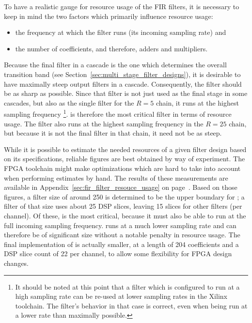 To  have a  realistic gauge  for  resource usage  of  the FIR  filters, it  is
necessary to keep  in mind the two factors which  primarily influence resource
usage:
\begin{itemize}\tightlist
    \item
        the frequency  at which the  filter runs (its incoming  sampling rate)
        and
    \item
         the number of coefficients, and therefore, adders and multipliers.
\end{itemize}
Because the final filter in a cascade  is the one which determines the overall
transition  band  (see  Section~\ref{sec:multi_stage_filter_designs}),  it  is
desirable to have  maximally steep output filters  in a cascade. Consequently,
the filter  should be as  sharp as possible. Since that filter is
not just  used as the  final stage  in some cascades,  but also as  the single
filter for the $R=5$ chain, it runs at the highest sampling frequency%
\footnote{%
    It should be noted at this point  that a filter which is configured to run
    at a  high sampling  rate can be  re-used at lower  sampling rates  in the
    Xilinx toolchain. The filter's behavior in that case is correct, even when
    being run at a lower rate than maximally possible.%
}.
  is therefore  the most  critical  filter in  terms of  resource
usage. The filter  also runs  at the highest sampling frequency in
the $R=25$  chain, but because it  is not the  final filter in that  chain, it
need not be as steep.

While it is possible to estimate the needed resources of a given filter design
based on  its specifications,  reliable figures  are best  obtained by  way of
experiment. The FPGA toolchain might make optimizations which are hard to take
into  account  when  performing  estimates  by hand.   The  results  of  these
measurements are  available in  Appendix~\ref{sec:fir_filter_resouce_usage} on
page~\pageref{sec:fir_filter_resouce_usage}. Based on those  figures, a filter
size  of  around  \num{250}  is  determined  to  be  the  upper  boundary  for
; a filter  of that size uses about \num{25}  DSP slices, leaving
\num{15} slices  for other filters  (per channel).  Of these,   is
the most critical,  because it must also  be able to run at  the full incoming
sampling frequency.   runs at a much lower sampling  rate and can
therefore be of significant size without  a notable penalty in resource usage.
The final implementation of  is  actually smaller, at a length of
\num{204} coefficients and a DSP slice count of \num{22} per channel, to allow
some flexibility for FPGA design changes.

